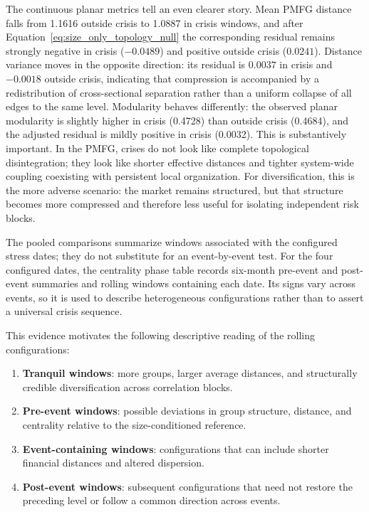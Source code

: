 \documentclass[a4paper,fleqn,review]{cas-sc}
\begin{document}
The continuous planar metrics tell an even clearer story. Mean PMFG distance falls from 1.1616 outside crisis to 1.0887 in crisis windows, and after Equation~\ref{eq:size_only_topology_null} the corresponding residual remains strongly negative in crisis ($-0.0489$) and positive outside crisis ($0.0241$). Distance variance moves in the opposite direction: its residual is $0.0037$ in crisis and $-0.0018$ outside crisis, indicating that compression is accompanied by a redistribution of cross-sectional separation rather than a uniform collapse of all edges to the same level. Modularity behaves differently: the observed planar modularity is slightly higher in crisis (0.4728) than outside crisis (0.4684), and the adjusted residual is mildly positive in crisis (0.0032). This is substantively important. In the PMFG, crises do not look like complete topological disintegration; they look like shorter effective distances and tighter system-wide coupling coexisting with persistent local organization. For diversification, this is the more adverse scenario: the market remains structured, but that structure becomes more compressed and therefore less useful for isolating independent risk blocks.

The pooled comparisons summarize windows associated with the configured stress dates; they do not substitute for an event-by-event test. For the four configured dates, the centrality phase table records six-month pre-event and post-event summaries and rolling windows containing each date. Its signs vary across events, so it is used to describe heterogeneous configurations rather than to assert a universal crisis sequence.

This evidence motivates the following descriptive reading of the rolling configurations:
\begin{enumerate}
    \item \textbf{Tranquil windows}: more groups, larger average distances, and structurally credible diversification across correlation blocks.
    \item \textbf{Pre-event windows}: possible deviations in group structure, distance, and centrality relative to the size-conditioned reference.
    \item \textbf{Event-containing windows}: configurations that can include shorter financial distances and altered dispersion.
    \item \textbf{Post-event windows}: subsequent configurations that need not restore the preceding level or follow a common direction across events.
\end{enumerate}
\end{document}
